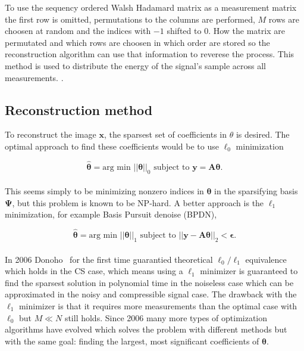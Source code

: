 To use the sequency ordered Walsh Hadamard matrix as a measurement matrix the first row is omitted, permutations to the columns are performed, $M$ rows are choosen at random and the indices with $-1$ shifted to $0$. How the matrix are permutated and which rows are choosen in which order are stored so the reconstruction algorithm can use that information to reverese the process. This method is used to distribute the energy of the signal's sample across all measurements.   \cite{article:SRM_long, article:TVAL3, article:an_improved_WH_matrix}. 


\subsection{Reconstruction method}
To reconstruct the image $\textbf{x}$, the sparsest set of coefficients in $\theta$ is desired. The optimal approach to find these coefficients would be to use $\ell_0$ minimization


\begin{equation}
   \mathbf{ \hat{\theta}} = \text{arg min } ||\mathbf{\theta}||_0 \text{  subject to  } \mathbf{y = A\theta} \text{.}
\end{equation}\\[0.1in]


This seems simply to be minimizing nonzero indices in $\mathbf{\theta}$ in the sparsifying basis $\mathbf{\Psi}$, but this problem is known to be NP-hard. A better approach is the $\ell_1$ minimization, for example Basis Pursuit denoise (BPDN),

\begin{equation}
    \mathbf{\hat{\theta}} = \text{arg min } ||\mathbf{\theta}||_1 \text{  subject to  } ||\mathbf{y - A\theta}||_2 < \mathbf{\epsilon} \text{.}
\end{equation}\\[0.1in]


In 2006 Donoho~\cite{article:CS_donoho1} for the first time guarantied theoretical $\ell_0\text{/}\ell_1$ equivalence which holds in the CS case, which means using a $\ell_1$ minimizer is guaranteed to find the sparsest solution in polynomial time in the noiseless case which can be approximated in the noisy and compressible signal case. The drawback with the $\ell_1$ minimizer is that it requires more measurements than the optimal case with $\ell_0$ but $M \ll N$ still holds. Since 2006 many more types of optimization algorithms have evolved which solves the problem with different methods but with the same goal: finding the largest, most significant coefficients of $\mathbf{\theta}$. \cite{article:CS_donoho1, article:single_pixel_im_cs, article:a_new_ci_arc}


